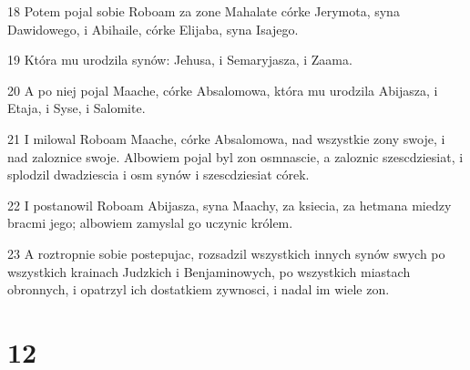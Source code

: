 \par 18 Potem pojal sobie Roboam za zone Mahalate córke Jerymota, syna Dawidowego, i Abihaile, córke Elijaba, syna Isajego.
\par 19 Która mu urodzila synów: Jehusa, i Semaryjasza, i Zaama.
\par 20 A po niej pojal Maache, córke Absalomowa, która mu urodzila Abijasza, i Etaja, i Syse, i Salomite.
\par 21 I milowal Roboam Maache, córke Absalomowa, nad wszystkie zony swoje, i nad zaloznice swoje. Albowiem pojal byl zon osmnascie, a zaloznic szescdziesiat, i splodzil dwadziescia i osm synów i szescdziesiat córek.
\par 22 I postanowil Roboam Abijasza, syna Maachy, za ksiecia, za hetmana miedzy bracmi jego; albowiem zamyslal go uczynic królem.
\par 23 A roztropnie sobie postepujac, rozsadzil wszystkich innych synów swych po wszystkich krainach Judzkich i Benjaminowych, po wszystkich miastach obronnych, i opatrzyl ich dostatkiem zywnosci, i nadal im wiele zon.

\chapter{12}

